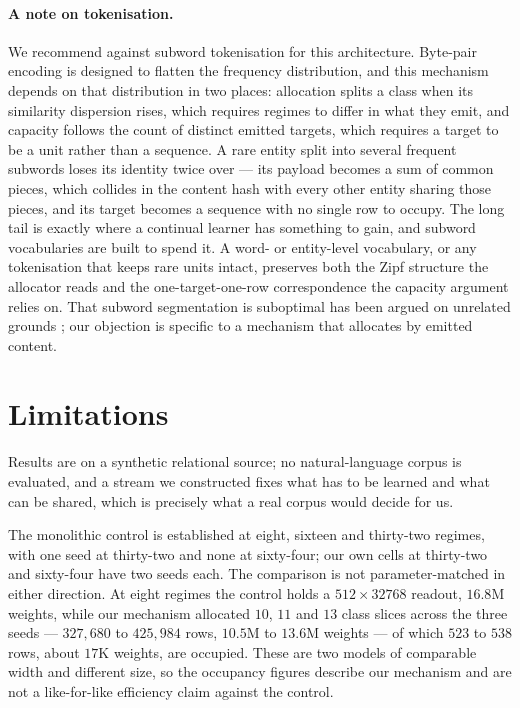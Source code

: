 \documentclass[11pt,a4paper]{article}
\begin{document}
\paragraph{A note on tokenisation.}
We recommend against subword tokenisation for this architecture. Byte-pair
encoding \citep{sennrich2016neural} is designed to flatten the frequency
distribution, and this mechanism
depends on that distribution in two places: allocation splits a class when its
similarity dispersion rises, which requires regimes to differ in what they
emit, and capacity follows the count of distinct emitted targets, which
requires a target to be a unit rather than a sequence. A rare entity split into
several frequent subwords loses its identity twice over --- its payload becomes
a sum of common pieces, which collides in the content hash with every other
entity sharing those pieces, and its target becomes a sequence with no single
row to occupy. The long tail is exactly where a continual learner has something
to gain, and subword vocabularies are built to spend it. A word- or
entity-level vocabulary, or any tokenisation that keeps rare units intact,
preserves both the Zipf structure the allocator reads
\citep{zipf1949human,piantadosi2014zipf} and the one-target-one-row
correspondence the capacity argument relies on. That subword segmentation is
suboptimal has been argued on unrelated grounds \citep{bostrom2020byte}; our
objection is specific to a mechanism that allocates by emitted content.

\section{Limitations}

Results are on a synthetic relational source; no natural-language corpus is
evaluated, and a stream we constructed fixes what has to be learned and what
can be shared, which is precisely what a real corpus would decide for us.

The monolithic control is established at eight, sixteen and thirty-two regimes,
with one seed at thirty-two and none at sixty-four; our own cells at thirty-two
and sixty-four have two seeds each. The comparison is not parameter-matched in
either direction. At eight regimes the control holds a $512\times32768$
readout, $16.8$M weights, while our mechanism allocated $10$, $11$ and $13$
class slices across the three seeds --- $327{,}680$ to $425{,}984$ rows, $10.5$M
to $13.6$M weights --- of which $523$ to $538$ rows, about $17$K weights, are
occupied. These are two models of comparable width and different size, so the
occupancy figures describe our mechanism and are not a like-for-like efficiency
claim against the control.
\end{document}
